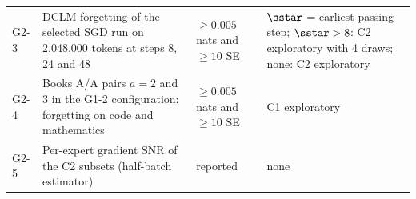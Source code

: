 \begin{longtable}{@{}>{\raggedright\arraybackslash}p{1.15cm}>{\raggedright\arraybackslash}p{5.4cm}>{\raggedright\arraybackslash}p{2.7cm}>{\raggedright\arraybackslash}p{5.2cm}@{}}
G2-3 & DCLM forgetting of the selected SGD run on 2,048,000 tokens at steps 8, 24 and 48 & $\ge0.005$ nats and $\ge10$ SE & $\sstar$ = earliest passing step; $\sstar>8$: C2 exploratory with 4 draws; none: C2 exploratory\\
G2-4 & Books A/A pairs $a=2$ and 3 in the G1-2 configuration: forgetting on code and mathematics & $\ge0.005$ nats and $\ge10$ SE & C1 exploratory\\
G2-5 & Per-expert gradient SNR of the C2 subsets (half-batch estimator) & reported & none\\
\end{longtable}
